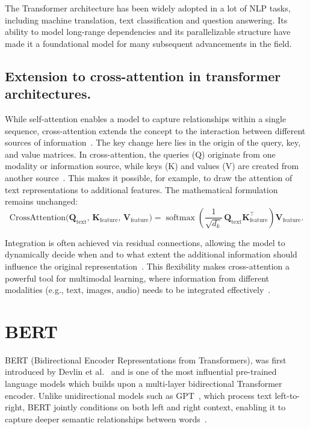 The Transformer architecture has been widely adopted in a lot of NLP tasks, including machine translation, text classification and question answering. Its ability to model long-range dependencies and its parallelizable structure have made it a foundational model for many subsequent advancements in the field.

\subsection{Extension to cross-attention in transformer architectures.}
While self-attention enables a model to capture relationships within a single sequence, cross-attention extends the concept to the interaction between different sources of information~\parencite{vaswani2017attention}. The key change here lies in the origin of the query, key, and value matrices. In cross-attention, the queries (Q) originate from one modality or information source, while keys (K) and values (V) are created from another source~\parencite{vaswani2017attention}. This makes it possible, for example, to draw the attention of text representations to additional features. The mathematical formulation remains unchanged:
\[
\mathrm{CrossAttention}\bigl(\mathbf{Q}_{\text{text}},\, \mathbf{K}_{\text{feature}},\, \mathbf{V}_{\text{feature}}\bigr)
= \operatorname{softmax}\!\left(\frac{1}{\sqrt{d_k}}\, \mathbf{Q}_{\text{text}} \mathbf{K}_{\text{feature}}^{\top}\right) \mathbf{V}_{\text{feature}}.
\]

Integration is often achieved via residual connections, allowing the model to dynamically decide when and to what extent the additional information should influence the original representation~\parencite{cai2025multimodal}. This flexibility makes cross-attention a powerful tool for multimodal learning, where information from different modalities (e.g., text, images, audio) needs to be integrated effectively~\parencite{li2024multimodal}. %




\section{BERT}
BERT (Bidirectional Encoder Representations from Transformers), was first introduced by Devlin et al.~\textcite{devlin2019bert} and is one of the most influential pre-trained language models which builds upon a multi-layer bidirectional Transformer encoder. Unlike unidirectional models such as GPT~\parencite{radford2018gpt}, which process text left-to-right, BERT jointly conditions on both left and right context, enabling it to capture deeper semantic relationships between words~\parencite{rogers2020primerbertologyknowbert}.

